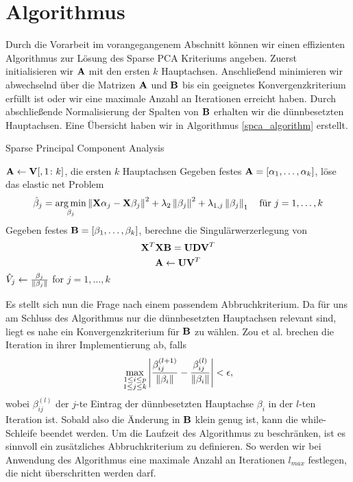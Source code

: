 \section{Algorithmus}

Durch die Vorarbeit im vorangegangenem Abschnitt können wir einen effizienten Algorithmus zur Lösung des Sparse PCA Kriteriums angeben. Zuerst initialisieren wir $\mathbf{A}$ mit den ersten $k$ Hauptachsen. Anschließend minimieren wir abwechselnd über die Matrizen $\mathbf{A}$ und $\mathbf{B}$ bis ein geeignetes Konvergenzkriterium erfüllt ist oder wir eine maximale Anzahl an Iterationen erreicht haben. Durch abschließende Normalisierung der Spalten von $\mathbf{B}$ erhalten wir die dünnbesetzten Hauptachsen. Eine Übersicht haben wir in Algorithmus \ref{spca_algorithm} erstellt.

\begin{algorithm}[tbh]
    \caption{Sparse Principal Component Analysis}
    \label{spca_algorithm}
    \begin{algorithmic}[1]
        	\State $\mathbf{A} \gets \mathbf{V}[,1 \colon k]$, die ersten $k$ Hauptachsen
                \State Gegeben festes $\mathbf{A} = [\alpha_1, \ldots, \alpha_k]$, löse das elastic net Problem
                $$\hat{\beta}_j = \operatorname*{arg\,min}_{\beta_j} \left\lVert \mathbf{X} \alpha_j - \mathbf{X} \beta_j \right\rVert^{2} + \lambda_2 \left\lVert \beta_j \right\rVert^2 + \lambda_{1,j}\left\lVert \beta_j \right\rVert_{1} \quad \text{für } j = 1, \ldots, k$$
                \State Gegeben festes $\mathbf{B} = [\beta_1, \ldots, \beta_k]$, berechne die Singulärwerzerlegung von $$\mathbf{X}^T \mathbf{X} \mathbf{B} = \mathbf{U} \mathbf{D} \mathbf{V}^T$$
                $$\mathbf{A} \gets \mathbf{U} \mathbf{V}^T$$
            \EndWhile
            \State $\hat{V}_j \gets \frac{\beta_j}{\left\lVert \beta_j \right\rVert}$ for $j = 1, \ldots, k$
        \EndProcedure
    \end{algorithmic}
\end{algorithm} 

Es stellt sich nun die Frage nach einem passendem Abbruchkriterium. Da für uns am Schluss des Algorithmus nur die dünnbesetzten Hauptachsen relevant sind, liegt es nahe ein Konvergenzkriterium für $\mathbf{B}$ zu wählen. Zou et al. brechen die Iteration in ihrer Implementierung ab, falls
$$\max_{\substack{1 \leq i \leq p \\ 1 \leq j \leq k}} \left| \frac{\beta_{ij}^{(l+1)}}{\left\lVert \beta_i \right\rVert} - \frac{\beta_{ij}^{(l)}}{\left\lVert \beta_i \right\rVert} \right| < \epsilon ,$$
wobei $\beta_{ij}^{(l)}$ der $j$-te Eintrag der dünnbesetzten Hauptachse $\beta_i$ in der $l$-ten Iteration ist. Sobald also die Änderung in $\mathbf{B}$ klein genug ist, kann die while-Schleife beendet werden. Um die Laufzeit des Algorithmus zu beschränken, ist es sinnvoll ein zusätzliches Abbruchkriterium zu definieren. So werden wir bei Anwendung des Algorithmus eine maximale Anzahl an Iterationen $l_{max}$ festlegen, die nicht überschritten werden darf.




